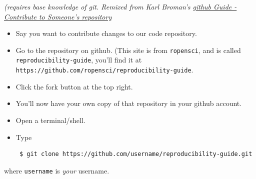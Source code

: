 \documentclass[
]{book}
\theoremstyle{definition}
\theoremstyle{definition}
\theoremstyle{definition}
\theoremstyle{definition}
\theoremstyle{remark}
\begin{document}
\emph{(requires base knowledge of git. Remixed from Karl Broman's \href{http://kbroman.github.io/github_tutorial/pages/fork.html}{github Guide - Contribute to Someone's repository}}

\begin{itemize}
\item
  Say you want to contribute changes to our code repository.
\item
  Go to the repository on github. (This site is from \texttt{ropensci}, and is called \texttt{reproducibility-guide}, you'll find it at \texttt{https://github.com/ropensci/reproducibility-guide}.
\item
  Click the fork button at the top right.
\item
  You'll now have your own copy of that repository in your github account.
\item
  Open a terminal/shell.
\item
  Type

\begin{verbatim}
 $ git clone https://github.com/username/reproducibility-guide.git
\end{verbatim}
\end{itemize}

where \texttt{username} is \emph{your} username.
\end{document}
